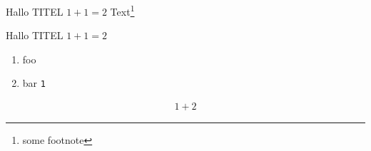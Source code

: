 \documentclass[parskip=full]{scrartcl}
\begin{document}
\begin{xframed}[head={this is my first box}]
Hallo TITEL $1+1=2$
\lipsum[1]
Text\footnote{some footnote}
\end{xframed}
\lipsum[1]
\clearpage



\begin{xframed}
\centering
Hallo TITEL $1+1=2$
\xframeddivide
\begin{enumerate}
\item foo%
\item bar \verb+1+
\end{enumerate}
\lipsum[1]
\begin{align}
1+2
\end{align}
\end{xframed}
\end{document}

